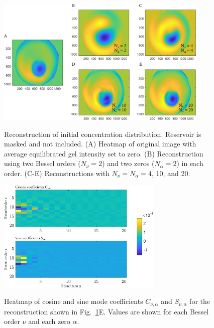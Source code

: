 \begin{figure}[t!]
\caption[Reconstruction of initial concentration distribution.]{Reconstruction of initial concentration distribution. Reservoir is masked and not included.  (A) Heatmap of original image with average equilibrated gel intensity set to zero. (B) Reconstruction using two Bessel orders ($N_\nu = 2$) and two zeros ($N_\alpha = 2$) in each order. (C-E) Reconstructions with $N_\nu = N_\alpha = 4$, 10, and 20.}
\centering
\includegraphics[width=0.9\textwidth]{figs/ch04/reconstruction-16_2_4_10_20.pdf}
\label{fig:initDist}
\end{figure} 

\begin{figure}[t!]
\caption[Heatmap of mode coefficients.]{Heatmap of cosine and sine mode coefficients $C_{\nu,\alpha}$ and $S_{\nu,\alpha}$ for the reconstruction shown in Fig.~\ref{fig:initDist}E. Values are shown for each Bessel order $\nu$ and each zero $\alpha$. \\}
\centering
\includegraphics[width=0.7\textwidth]{figs/ch04/rec_16_cos_sin_array_20_terms.pdf}
\label{fig:arrays}
\end{figure} 

